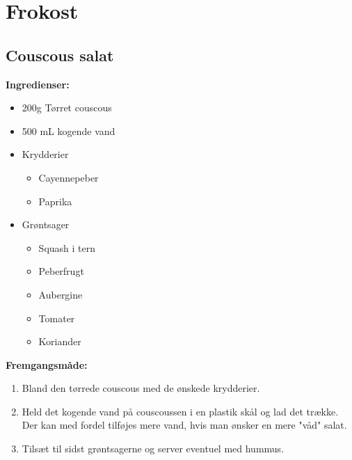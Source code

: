 \documentclass{book}
\begin{document}
\chapter{Frokost}
\minitoc
\clearpage \section{Couscous salat}
\begin{minipage}[t]{0.5\textwidth}
\textbf{Ingredienser:}
\begin{itemize}
    \item 200g Tørret couscous
    \item 500 mL kogende vand
    \item Krydderier
    \begin{itemize}
        \item Cayennepeber
        \item Paprika
    \end{itemize}
    \item Grøntsager
    \begin{itemize}
        \item Squash i tern
        \item Peberfrugt
        \item Aubergine
        \item Tomater
        \item Koriander
    \end{itemize}
\end{itemize}
\end{minipage}
\begin{minipage}[t]{0.5\textwidth}
\textbf{Fremgangsmåde:}
\begin{enumerate}
    \item Bland den tørrede couscous med de ønskede krydderier. 
    \item Held det kogende vand på couscoussen i en plastik skål og lad det trække. Der kan med fordel tilføjes mere vand, hvis man ønsker en mere "våd" salat.
    \item Tilsæt til sidst grøntsagerne og server eventuel med hummus.
\end{enumerate}
\end{minipage}
\newpage
\end{document}
